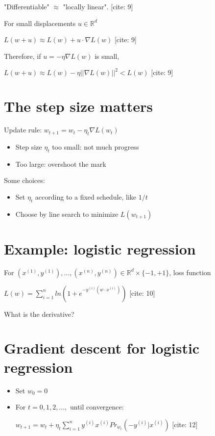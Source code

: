 \documentclass{article}
\begin{document}
"Differentiable" $\approx$ "locally linear". [cite: 9]

For small displacements $u\in\mathbb{R}^{d}$

$L(w+u)\approx L(w)+u\cdot\nabla L(w)$  [cite: 9]

Therefore, if $u=-\eta\nabla L(w)$ is small,

$L(w+u)\approx L(w)-\eta||\nabla L(w)||^{2}<L(w)$ [cite: 9]

\section{The step size matters}

Update rule: $w_{t+1}=w_{t}-\eta_{t}\nabla L(w_{t})$

\begin{itemize}
    \item Step size $\eta_{t}$ too small: not much progress
    \item Too large: overshoot the mark
\end{itemize}

Some choices:

\begin{itemize}
    \item Set $\eta_{t}$ according to a fixed schedule, like $1/t$
    \item Choose by line search to minimize $L(w_{t+1})$
\end{itemize}

\section{Example: logistic regression}

For $(x^{(1)},y^{(1)}),...,(x^{(n)},y^{(n)})\in\mathbb{R}^{d}\times\{-1,+1\}$, loss function

$L(w)=\sum_{i=1}^{n}ln(1+e^{-y^{(i)}(w\cdot x^{(i)})})$  [cite: 10]

What is the derivative?

\section{Gradient descent for logistic regression}

\begin{itemize}
    \item Set $w_{0}=0$
    \item For $t=0,1,2,...,$ until convergence:

    $w_{t+1}=w_{t}+\eta_{t}\sum_{i=1}^{n}y^{(i)}x^{(i)}Pr_{w_{t}}(-y^{(i)}|x^{(i)})$  [cite: 12]
\end{itemize}
\end{document}
